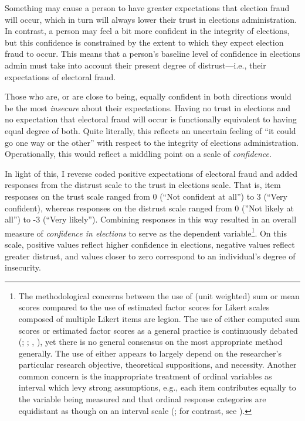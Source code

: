 \documentclass[
  12pt,
  letterpaper,
]{article}
\begin{document}
Something may cause a person to have greater expectations that election
fraud will occur, which in turn will always lower their trust in
elections administration. In contrast, a person may feel a bit more
confident in the integrity of elections, but this confidence is
constrained by the extent to which they expect election fraud to occur.
This means that a person's baseline level of confidence in elections
admin must take into account their present degree of distrust---i.e.,
their expectations of electoral fraud.

Those who are, or are close to being, equally confident in both
directions would be the most \emph{insecure} about their expectations.
Having no trust in elections and no expectation that electoral fraud
will occur is functionally equivalent to having equal degree of both.
Quite literally, this reflects an uncertain feeling of ``it could go one
way or the other'' with respect to the integrity of elections
administration. Operationally, this would reflect a middling point on a
scale of \emph{confidence}.

In light of this, I reverse coded positive expectations of electoral
fraud and added responses from the distrust scale to the trust in
elections scale. That is, item responses on the trust scale ranged from
0 (``Not confident at all'') to 3 (``Very confident), whereas responses
on the distrust scale ranged from 0 (''Not likely at all'') to -3
(``Very likely''). Combining responses in this way resulted in an
overall measure of \emph{confidence in elections} to serve as the
dependent variable\footnote{The methodological concerns between the use
  of (unit weighted) sum or mean scores compared to the use of estimated
  factor scores for Likert scales composed of multiple Likert items are
  legion. The use of either computed sum scores or estimated factor
  scores as a general practice is continuously debated
  (;
  ;
  ,
  ), yet there is no general consensus
  on the most appropriate method generally. The use of either appears to
  largely depend on the researcher's particular research objective,
  theoretical suppositions, and necessity. Another common concern is the
  inappropriate treatment of ordinal variables as interval which levy
  strong assumptions, e.g., each item contributes equally to the
  variable being measured and that ordinal response categories are
  equidistant as though on an interval scale
  (; for contrast, see
  ).}. On this scale,
positive values reflect higher confidence in elections, negative values
reflect greater distrust, and values closer to zero correspond to an
individual's degree of insecurity.
\end{document}
